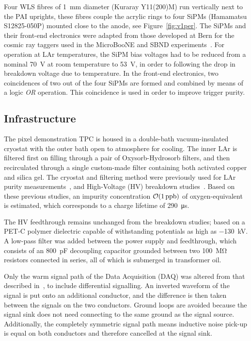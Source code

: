\documentclass[instruments,article,submit,moreauthors,pdftex]{Definitions/mdpi}
\begin{document}
Four WLS fibres of \SI{1}{\milli\metre} diameter (Kuraray Y11(200)M) run vertically next to the PAI uprights, these fibres couple the acrylic rings to four SiPMs (Hamamatsu S12825-050P) mounted close to the anode, see Figure~\ref{fig:v1per}. 
The SiPMs and their front-end electronics were adapted from those developed at Bern for the cosmic ray taggers used in the MicroBooNE and SBND experiments~\cite{CRT, CRT2}.
For operation at LAr temperatures, the SiPM bias voltages had to be reduced from a nominal \SI{70}{\volt} at room temperature to \SI{53}{\volt}, in order to following the drop in breakdown voltage due to temperature.   
In the front-end electronics, two coincidences of two out of the four SiPMs are formed and combined by means of a logic \textit{OR} operation. 
This coincidence is used in order to improve trigger purity.

\subsection{Infrastructure}

The pixel demonstration TPC is housed in a double-bath vacuum-insulated cryostat with the outer bath open to atmosphere for cooling.
The inner LAr is filtered first on filling through a pair of Oxysorb-Hydrosorb filters, and then recirculated through a single custom-made filter containing both activated copper and silica gel.
The cryostat and filtering method were previously used for LAr purity measurements~\cite{purititty}, and High-Voltage (HV) breakdown studies~\cite{HVoriginal}.
Based on these previous studies, an impurity concentration $\order{\SI{1}{ppb}}$ of oxygen-equivalent is estimated, which corresponds to a charge lifetime of \SI{290}{\micro\second}.

The HV feedthrough remains unchanged from the breakdown studies; based on a PET-C polymer dielectric capable of withstanding potentials as high as \SI{-130}{\kilo\volt}.
A low-pass filter was added between the power supply and feedthrough, which consists of an \SI{800}{\pico\farad} decoupling capacitor grounded between two \SI{100}{\mega\ohm} resistors connected in series, all of which is submerged in transformer oil.  

Only the warm signal path of the Data Acquisition (DAQ) was altered from that described in~\cite{protoLASER}, to include differential signalling.
An inverted waveform of the signal is put onto an additional conductor, and the difference is then taken between the signals on the two conductors.
Ground loops are avoided because the signal sink does not need connecting to the same ground as the signal source.
Additionally, the completely symmetric signal path means inductive noise pick-up is equal on both conductors and therefore cancelled at the signal sink.
\end{document}

